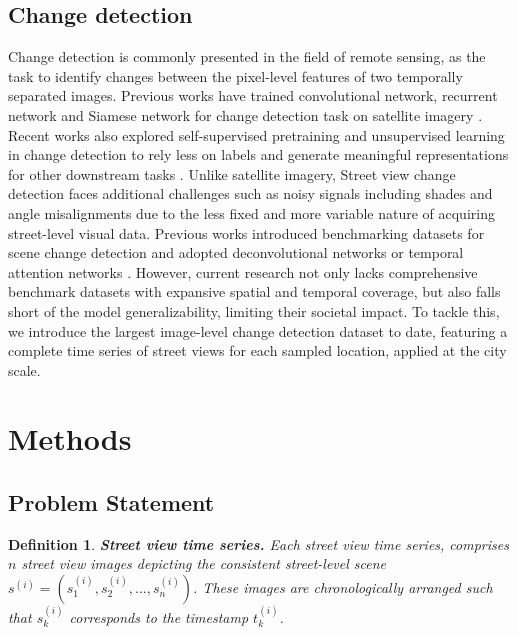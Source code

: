 \documentclass[letterpaper]{article} %
\newtheorem{definition}{Definition}
\begin{document}
\subsection{Change detection}
Change detection is commonly presented in the field of remote sensing, as the task to identify changes between the pixel-level features of two temporally separated images. Previous works have trained convolutional network, recurrent network and Siamese network for change detection task on satellite imagery \cite{Gong2016ChangeDI,Daudt2018FullyCS,Lyu2016LearningAT}. Recent works also explored self-supervised pretraining and unsupervised learning in change detection to rely less on labels and generate meaningful representations for other downstream tasks \cite{Cong2022SatMAEPT,Mall2022ChangeED}. Unlike satellite imagery, Street view change detection faces additional challenges such as noisy signals including shades and angle misalignments due to the less fixed and more variable nature of acquiring street-level visual data. Previous works introduced benchmarking datasets for scene change detection and adopted deconvolutional networks or temporal attention networks \cite{Alcantarilla2016StreetviewCD,Sakurada2015ChangeDF,Chen2021DRTANetDR}. However, current research not only lacks comprehensive benchmark datasets with expansive spatial and temporal coverage, but also falls short of the model generalizability, limiting their societal impact. To tackle this, we introduce the largest image-level change detection dataset to date, featuring a complete time series of street views for each sampled location, applied at the city scale.


\section{Methods}
\subsection{Problem Statement}
\begin{definition}
\textbf{Street view time series.}
Each street view time series, comprises $n$ street view images depicting the consistent street-level scene $s^{(i)}=(s^{(i)}_{1}, s^{(i)}_{2}, ... , s^{(i)}_{n})$. These images are chronologically arranged such that $s^{(i)}_{k}$ corresponds to the timestamp $t^{(i)}_k$.
\end{definition}
\end{document}

